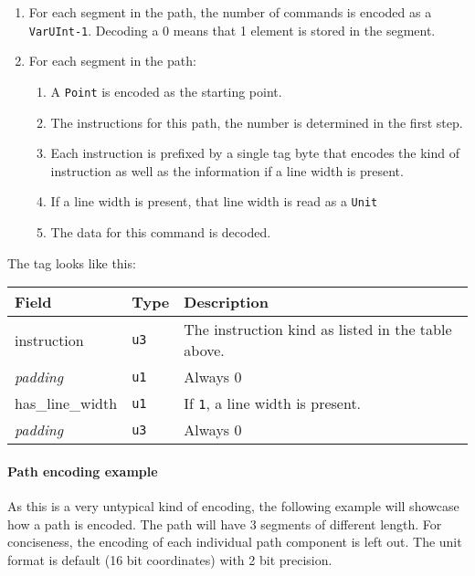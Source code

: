 \documentclass[]{article}
\providecommand{\tightlist}{%
  \setlength{\itemsep}{0pt}\setlength{\parskip}{0pt}}
\begin{document}
\begin{enumerate}
\def\labelenumi{\arabic{enumi}.}
\tightlist
\item
  For each segment in the path, the number of commands is encoded as a
  \texttt{VarUInt-1}. Decoding a 0 means that 1 element is stored in the segment.
\item
  For each segment in the path:

  \begin{enumerate}
  \def\labelenumii{\arabic{enumii}.}
  \tightlist
  \item
    A \texttt{Point} is encoded as the starting point.
  \item
    The instructions for this path, the number is determined in the
    first step.
  \item
    Each instruction is prefixed by a single tag byte that encodes the
    kind of instruction as well as the information if a line width is
    present.
  \item
    If a line width is present, that line width is read as a
    \texttt{Unit}
  \item
    The data for this command is decoded.
  \end{enumerate}
\end{enumerate}

The tag looks like this:

\begin{longtable}[]{@{}p{1in}p{0.5in}p{4.5in}@{}}
\toprule
Field & Type & Description \\
\midrule
\endhead
instruction & \texttt{u3} & The instruction kind as listed in the table above. \\
\emph{padding} & \texttt{u1} & Always 0 \\
has\_line\_width & \texttt{u1} & If \texttt{1}, a line width is present. \\
\emph{padding} & \texttt{u3} & Always 0 \\
\bottomrule
\end{longtable}

\paragraph{Path encoding example} As this is a very untypical kind of encoding, the following example will showcase how a path is encoded. The path will have 3 segments of different length. For conciseness, the encoding of each individual path component is left out. The unit format is default (16 bit coordinates) with 2 bit precision.
\end{document}
